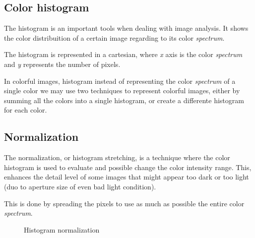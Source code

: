 \documentclass{article}
\begin{document}
	\subsection{Color histogram}

		The histogram is an important tools when dealing with image analysis. It shows the color distribuition of a certain image regarding to its 
		color \textit{spectrum}.
			
		The histogram is represented in a cartesian, where \textit{x} axis is the 
		color \textit{spectrum} and \textit{y} represents the number of pixels.

		In colorful images, histogram instead of representing the color \textit{spectrum} of a single color we may use two techniques
		to represent colorful images, either by summing all the colors into a single histogram, or create a differente histogram for each 
		color.
		

	\subsection{Normalization}
		
		The normalization, or histogram stretching, is a technique where the color histogram is used to evaluate and possible change
		the color intensity range. This, enhances the detail level of some images that might appear too dark or too light (duo to aperture size of even
		bad light condition).

		This is done by spreading the pixels to use as much as possible the entire color \textit{spectrum}.
		
		\begin{figure}
		  \centering
		  \caption{Histogram normalization}
		  \label{fig:normalization}
		\end{figure}
\end{document}
